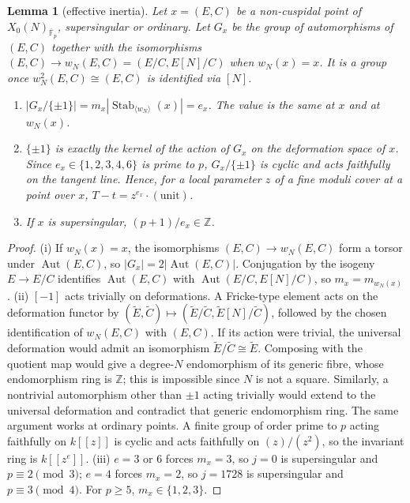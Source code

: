 \documentclass[11pt,a4paper]{article}
\numberwithin{equation}{section}
\newtheorem{lemma}[theorem]{Lemma}
\theoremstyle{definition}
\theoremstyle{remark}
\newcommand{\Fb}{\overline{\mathbb F}_p}
\newcommand{\Z}{\mathbb Z}
\newcommand{\Aut}{\operatorname{Aut}}
\newcommand{\Stab}{\operatorname{Stab}}
\begin{document}
\begin{lemma}[effective inertia]\label{lem:inertia}
Let $x=(E,C)$ be a non-cuspidal point of $X_0(N)_{\Fb}$, supersingular or ordinary. Let $G_x$ be the group of automorphisms
of $(E,C)$ together with the isomorphisms $(E,C)\to w_N(E,C)=(E/C,E[N]/C)$ when $w_N(x)=x$. It is a group once
$w_N^2(E,C)\cong(E,C)$ is identified via $[N]$.
\begin{enumerate}[label=\textup{(\roman*)}]
\item $|G_x/\{\pm1\}|=m_x|\Stab_{\langle w_N\rangle}(x)|=e_x$. The value is the same at $x$ and at $w_N(x)$.
\item $\{\pm1\}$ is exactly the kernel of the action of $G_x$ on the deformation space of $x$. Since
$e_x\in\{1,2,3,4,6\}$ is prime to $p$, $G_x/\{\pm1\}$ is cyclic and acts faithfully on the tangent line.
Hence, for a local parameter $z$ of a fine moduli cover at a point over $x$, $T-t=z^{e_x}\cdot(\text{unit})$.
\item If $x$ is supersingular, $(p+1)/e_x\in\Z$.
\end{enumerate}
\end{lemma}
\begin{proof}
(i) If $w_N(x)=x$, the isomorphisms $(E,C)\to w_N(E,C)$ form a torsor under $\Aut(E,C)$, so
$|G_x|=2|\Aut(E,C)|$. Conjugation by the isogeny $E\to E/C$ identifies $\Aut(E,C)$ with
$\Aut(E/C,E[N]/C)$, so $m_x=m_{w_N(x)}$.
(ii) $[-1]$ acts trivially on deformations. A Fricke-type element acts
on the deformation functor by
$(\widetilde E,\widetilde C)\mapsto
(\widetilde E/\widetilde C,\widetilde E[N]/\widetilde C)$,
followed by the chosen identification of $w_N(E,C)$ with $(E,C)$.
If its action were trivial, the universal deformation would admit an
isomorphism $\widetilde E/\widetilde C\cong\widetilde E$.
Composing with the quotient map would give a degree-$N$ endomorphism
of its generic fibre, whose endomorphism ring is $\Z$; this is impossible
since $N$ is not a square. Similarly, a nontrivial automorphism other
than $\pm1$ acting trivially would extend to the universal deformation
and contradict that generic endomorphism ring. The same argument works at ordinary points. A finite group of order prime to $p$ acting faithfully on $k[[z]]$ is cyclic and
acts faithfully on $(z)/(z^2)$, so the invariant ring is $k[[z^{e}]]$.
(iii) $e=3$ or $6$ forces $m_x=3$, so $j=0$ is supersingular and $p\equiv2\pmod3$; $e=4$ forces
$m_x=2$, so $j=1728$ is supersingular and $p\equiv3\pmod4$. For $p\ge5$, $m_x\in\{1,2,3\}$.
\end{proof}
\end{document}
